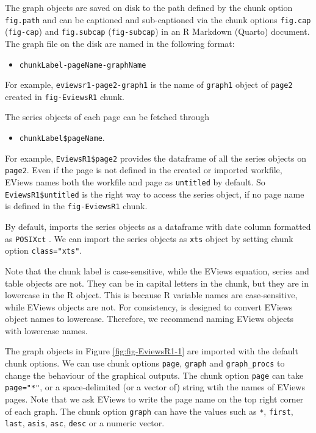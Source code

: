 The graph objects are saved on disk to the path defined by the chunk option \texttt{fig.path} and can be captioned and sub-captioned via the chunk options \texttt{fig.cap} (\texttt{fig-cap}) and \texttt{fig.subcap} (\texttt{fig-subcap}) in an R Markdown (Quarto) document. The graph file on the disk are named in the following format:

\begin{itemize}
\tightlist
\item
  \texttt{chunkLabel-pageName-graphName}
\end{itemize}

For example, \texttt{eviewsr1-page2-graph1} is the name of \texttt{graph1} object of \texttt{page2} created in \texttt{fig-EviewsR1} chunk.

The series objects of each page can be fetched through

\begin{itemize}
\tightlist
\item
  \texttt{chunkLabel\$pageName}.
\end{itemize}

For example, \texttt{EviewsR1\$page2} provides the dataframe of all the series objects on \texttt{page2}. Even if the page is not defined in the created or imported workfile, EViews names both the workfile and page as \texttt{untitled} by default. So \texttt{EviewsR1\$untitled} is the right way to access the series object, if no page name is defined in the \texttt{fig-EviewsR1} chunk.

By default,  imports the series objects as a dataframe with date column formatted as \texttt{POSIXct} . We can import the series objects as \texttt{xts} object by setting chunk option \texttt{class="xts"}.

Note that the chunk label is case-sensitive, while the EViews equation, series and table objects are not. They can be in capital letters in the chunk, but they are in lowercase in the R object. This is because R variable names are case-sensitive, while EViews objects are not. For consistency,  is designed to convert EViews object names to lowercase. Therefore, we recommend naming EViews objects with lowercase names.

The graph objects in Figure \ref{fig:fig-EviewsR1-1} are imported with the default chunk options. We can use chunk options \texttt{page}, \texttt{graph} and \texttt{graph\_procs} to change the behaviour of the graphical outputs. The chunk option \texttt{page} can take \texttt{page="*"}, or a space-delimited (or a vector of) string wtih the names of EViews pages. Note that we ask EViews to write the page name on the top right corner of each graph. The chunk option \texttt{graph} can have the values such as \texttt{*}, \texttt{first}, \texttt{last}, \texttt{asis}, \texttt{asc}, \texttt{desc} or a numeric vector.

